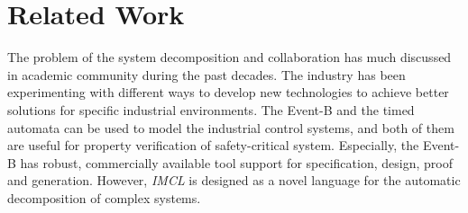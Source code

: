 ﻿\section{Related Work}

The problem of the system decomposition and collaboration has much discussed in academic community during the past decades. The industry has been experimenting with different ways to develop new technologies to achieve better solutions for specific industrial environments\cite{korhonen2001four}.
The Event-B\cite{Event-B} and the timed automata\cite{timeAutomata}\cite{TimedTools} can be used to model the industrial control systems, and both of them are useful for property verification of safety-critical system. Especially, the Event-B has robust, commercially available tool support for specification, design, proof and generation. However, \emph{IMCL} is designed as a novel language for the automatic decomposition of complex systems.

